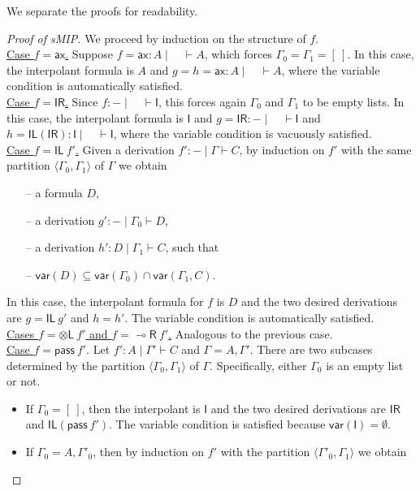 \documentclass[sn-mathphys-num]{sn-jnl}%
\newcommand{\GG}{\Gamma}
\newcommand{\vd}{\vdash}
\newcommand{\tl}{\otimes \mathsf{L}}
\newcommand{\pass}{\mathsf{pass}}
\newcommand{\unitl}{\mathsf{IL}}
\newcommand{\unitr}{\mathsf{IR}}
\newcommand{\ax}{\mathsf{ax}}
\newcommand{\lolli}{\multimap}
\newcommand{\lright}{{\lolli}\mathsf{R}}
\newcommand{\unit}{\mathsf{I}}
\newcommand{\mf}[1]{\mathsf{#1}}
\newcommand{\vars}[1]{\mf{var} (#1)}
\newcommand{\sMIP}{\textsf{sMIP}}
\theoremstyle{thmstyleone}%
\theoremstyle{thmstyletwo}%
\theoremstyle{thmstylethree}%
\begin{document}
We separate the proofs for readability.
\begin{proof}[Proof of \sMIP]
  We proceed by induction on the structure of $f$. 
  \\
  \underline{Case $f = \ax$.} Suppose $f = \ax : A \mid \quad \vd A$, which forces $\GG_0 = \GG_1 = [\ ]$.
  In this case, the interpolant formula is $A$ and $g = h = \ax : A \mid \quad \vd A$, where the variable condition is automatically satisfied.
  \\
  \underline{Case $f = \unitr$.} Since $f : {-} \mid \quad \vd \unit$, this forces again $\GG_0$ and $\GG_1$ to be empty lists.
  In this case, the interpolant formula is $\unit$ and $g =  \unitr : {-} \mid \quad \vd \unit$ and $h = \unitl (\unitr) : \unit \mid \quad \vd \unit$, where the variable condition is vacuously satisfied.
  \\
  \underline{Case $f = \unitl \ f'$.}
  Given a derivation $f' : {-} \mid \GG \vd C$, by induction on $f'$ with the same partition $\langle \GG_0, \GG_1 \rangle$ of $\GG$ we obtain  
  \begin{itemize}
    \item[--] a formula $D$,
    \item[--] a derivation $g' : {-} \mid \GG_0 \vd D$,
    \item[--] a derivation $h' : D \mid \GG_1 \vd C$, such that
    \item[--] $\vars{D} \subseteq \vars{\GG_0} \cap \vars{\GG_1 , C}$.
  \end{itemize}
  In this case, the interpolant formula for $f$ is $D$ and the two desired derivations are $g = \unitl \ g'$ and $h = h'$.
  The variable condition is automatically satisfied.
  \\
  \underline{Cases $f = \tl \ f'$ and $f = \lright \ f'$.} Analogous to the previous case.
  \\
  \underline{Case $f = \pass \ f'$}. Let $f' : A \mid \GG' \vd C$ and $\GG = A,\GG'$.
  There are two subcases determined by the partition $\langle \GG_0,\GG_1 \rangle$ of $\GG$. 
  Specifically, either $\GG_0$ is an empty list or not.
  \begin{itemize}
    \item If $\GG_0 = [\ ]$, then the interpolant is $\unit$ and the two desired derivations are $\unitr$ and $\unitl (\pass \ f')$.
    The variable condition is satisfied because $\vars{\unit} = \emptyset$.
    \item If $\GG_0 = A, \GG'_0$, then by induction on $f'$ with the partition $\langle \GG'_0, \GG_1 \rangle$ we obtain

\end{itemize}
\end{proof}
\end{document}
